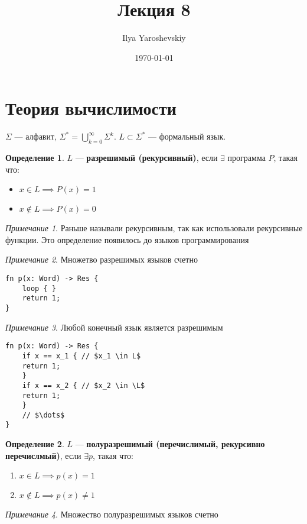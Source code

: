 \documentclass[english]{article}
\author{Ilya Yaroshevskiy}
\date{\today}
\title{Лекция 8}
\theoremstyle{plain}
\theoremstyle{remark}
\newtheorem*{remark}{Примечание}
\theoremstyle{definition}
\newtheorem*{definition}{Определение}
\begin{document}
\maketitle
\tableofcontents


\section{Теория вычислимости}
\label{sec:org3dc9915}
\(\Sigma\) --- алфавит, \(\Sigma^* = \bigcup_{k = 0}^\infty \Sigma^k\). \(L \subset \Sigma^*\) --- формальный язык.
\begin{definition}
\(L\) --- \textbf{разрешимый (рекурсивный)}, если \(\exists\) программа \(P\), такая что:
\begin{itemize}
\item \(x \in L \implies P(x) = 1\)
\item \(x \not\in L \implies P(x) = 0\)
\end{itemize}
\end{definition}
\begin{remark}
Раньше называли рекурсивным, так как использовали рекурсивные функции. Это определение появилось до языков программирования
\end{remark}
\begin{remark}
Множетво разрешимых языков счетно
\begin{verbatim}
fn p(x: Word) -> Res {
    loop { }
    return 1;
}
\end{verbatim}
\end{remark}
\begin{remark}
Любой конечный язык является разрешимым
\begin{verbatim}
fn p(x: Word) -> Res {
    if x == x_1 { // $x_1 \in L$
	return 1; 
    }
    if x == x_2 { // $x_2 \in \L$
	return 1;
    }
    // $\dots$
}
\end{verbatim}
\end{remark}
\begin{definition}
\(L\) --- \textbf{полуразрешимый (перечислимый, рекурсивно перечислмый)}, если \(\exists p\), такая что:
\begin{enumerate}
\item \(x \in L \implies p(x) = 1\)
\item \(x \not\in L \implies p(x) \neq 1\)
\end{enumerate}
\end{definition}
\begin{remark}
Множество полуразрешимых языков счетно
\end{remark}
\end{document}
